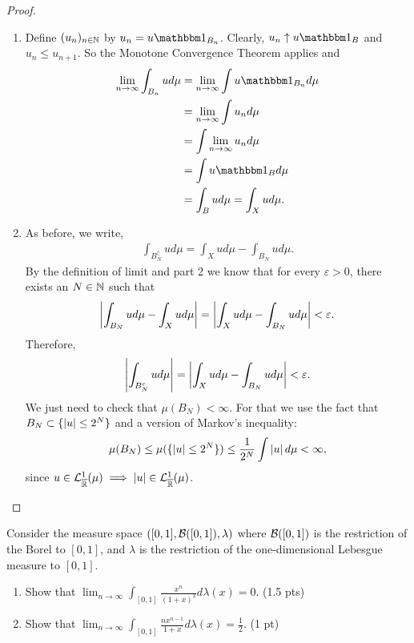 \begin{proof}
\begin{enumerate}
		
		\item Define $(u_n)_{n\in\mathbb{N}}$ by $u_n = u \ind_{B_n}$. Clearly, $u_n \uparrow u \ind_B$ and $u_n \leq u_{n+1}$. So the Monotone Convergence Theorem applies and
		\begin{align*}
		\lim_{n \to \infty} \int_{B_n} u d\mu
		&= \lim_{n \to \infty} \int u \ind_{B_n} d \mu \\
		&= \lim_{n \to \infty} \int u_n d\mu\\
		&= \int \lim_{n \to \infty} u_n d\mu\\
		&= \int u \ind_B d\mu\\
		&= \int_B ud\mu = \int_X u d\mu.
		\end{align*}
		
		\item As before, we write,
		\begin{align*}
		\int_{B_N^\complement} u d\mu
		= \int_X u d\mu - \int_{B_N} u d\mu.
		\end{align*}	
		By the definition of limit and part 2 we know that for every $\varepsilon > 0$, there exists an $N \in \mathbb{N}$ such that
		\begin{align*}
		\left\vert{\int_{B_N} u d\mu - \int_X u d\mu}\right\vert = \left\vert{ \int_X u d\mu - \int_{B_N} u d\mu}\right\vert < \varepsilon.
		\end{align*}
		Therefore,
		\begin{align*}
		\left\vert{\int_{B_N^c} u d\mu}\right\vert = \left\vert{\int_X u d\mu - \int_{B_N} u d\mu}\right\vert < \varepsilon.
		\end{align*}
		We just need to check that $\mu(B_N) < \infty$. For that we use the fact that $B_N \subset \{\left\vert{u}\right\vert \leq 2^N\}$ and a version of Markov's inequality:
		\begin{align*}
		\mu(B_N)
		\leq \mu(\{\left\vert{u}\right\vert \leq 2^N \})
		\leq \frac{1}{2^N} \int \left\vert{u}\right\vert d\mu < \infty,
		\end{align*}
		since $u \in \mathcal{L}_{\overline{\mathbb{R}}}^1(\mu) \implies \left\vert{u}\right\vert \in \mathcal{L}_{\overline{\mathbb{R}}}^1(\mu)$.
	\end{enumerate}
\end{proof}

\begin{ex}
	Consider the measure space $([0,1], \mathcal{B}([0, 1]), \lambda)$ where $\mathcal{B}([0,1])$ is the restriction of the Borel \siga to $[0,1]$, and $\lambda$ is the restriction of the one-dimensional Lebesgue measure to $[0,1]$.
	
	\begin{enumerate}
		\item Show that $\lim_{n \to \infty} \int_{[0,1]} \frac{x^n}{(1+ x)^2}d\lambda(x) = 0$. (1.5 pts)
		\item Show that $\lim_{n \to \infty} \int_{[0,1]} \frac{n x^{n-1}}{1 + x} d\lambda(x) = \frac{1}{2}$. (1 pt)
	\end{enumerate}
\end{ex}

